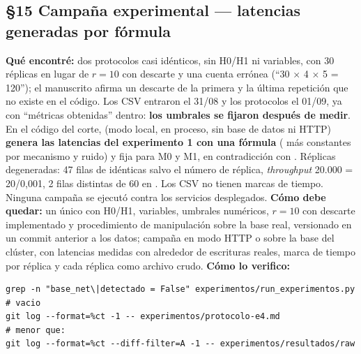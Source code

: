 \subsection*{\S15 Campa\~na experimental --- latencias generadas por f\'ormula}
\textbf{Qu\'e encontr\'e:} dos protocolos casi id\'enticos, sin H0/H1 ni variables, con 30 r\'eplicas en lugar de $r=10$ con descarte y una cuenta err\'onea (``30 $\times$ 4 $\times$ 5 = 120''); el manuscrito afirma un descarte de la primera y la \'ultima repetici\'on que no existe en el c\'odigo. Los CSV entraron el 31/08 y los protocolos el 01/09, ya con ``m\'etricas obtenidas'' dentro: \textbf{los umbrales se fijaron despu\'es de medir}. En el c\'odigo del corte,  (modo local, en proceso, sin base de datos ni HTTP) \textbf{genera las latencias del experimento 1 con una f\'ormula} ( m\'as constantes por mecanismo y ruido) y fija  para M0 y M1, en contradicci\'on con . R\'eplicas degeneradas: 47 filas de  id\'enticas salvo el n\'umero de r\'eplica, \emph{throughput} 20.000 = 20/0,001, 2 filas distintas de 60 en . Los CSV no tienen marcas de tiempo. Ninguna campa\~na se ejecut\'o contra los servicios desplegados. \textbf{C\'omo debe quedar:} un \'unico  con H0/H1, variables, umbrales num\'ericos, $r=10$ con descarte implementado y procedimiento de manipulaci\'on sobre la base real, versionado en un commit anterior a los datos; campa\~na en modo HTTP o sobre la base del cl\'uster, con latencias medidas con  alrededor de escrituras reales, marca de tiempo por r\'eplica y cada r\'eplica como archivo crudo. \textbf{C\'omo lo verifico:}\begin{verbatim}
grep -n "base_net\|detectado = False" experimentos/run_experimentos.py        # vacio
git log --format=%ct -1 -- experimentos/protocolo-e4.md                        # menor que:
git log --format=%ct --diff-filter=A -1 -- experimentos/resultados/raw
\end{verbatim}

